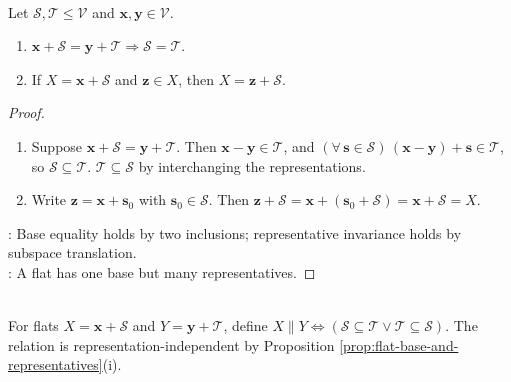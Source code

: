 \begin{proposition} \label{prop:flat-base-and-representatives} \\
Let $\mathcal{S},\mathcal{T}\leq\mathcal{V}$ and $\mathbf{x},\mathbf{y}\in\mathcal{V}$.
\begin{enumerate}[label=(\roman*)]
\setlength{\itemsep}{0pt}
\item $\mathbf{x}+\mathcal{S}=\mathbf{y}+\mathcal{T}\Rightarrow\mathcal{S}=\mathcal{T}$.
\item If $X=\mathbf{x}+\mathcal{S}$ and $\mathbf{z}\in X$, then $X=\mathbf{z}+\mathcal{S}$.
\end{enumerate}
\begin{proof}
\begin{enumerate}[label=(\roman*)]
\setlength{\itemsep}{0pt}
\item Suppose $\mathbf{x}+\mathcal{S}=\mathbf{y}+\mathcal{T}$. Then $\mathbf{x}-\mathbf{y}\in\mathcal{T}$, and $(\forall\,\mathbf{s}\in\mathcal{S})\,(\mathbf{x}-\mathbf{y})+\mathbf{s}\in\mathcal{T}$, so $\mathcal{S}\subseteq\mathcal{T}$. $\mathcal{T}\subseteq\mathcal{S}$ by interchanging the representations.
\item Write $\mathbf{z}=\mathbf{x}+\mathbf{s}_0$ with $\mathbf{s}_0\in\mathcal{S}$. Then $\mathbf{z}+\mathcal{S}=\mathbf{x}+(\mathbf{s}_0+\mathcal{S})=\mathbf{x}+\mathcal{S}=X$.
\end{enumerate}
: Base equality holds by two inclusions; representative invariance holds by subspace translation.\\
: A flat has one base but many representatives.
\end{proof}
\end{proposition}

\begin{definition} \label{def:parallel-flats} \\
For flats $X=\mathbf{x}+\mathcal{S}$ and $Y=\mathbf{y}+\mathcal{T}$, define $X\parallel Y\iff(\mathcal{S}\subseteq\mathcal{T}\lor\mathcal{T}\subseteq\mathcal{S})$. The relation is representation-independent by Proposition \ref{prop:flat-base-and-representatives}(i).
\end{definition}

